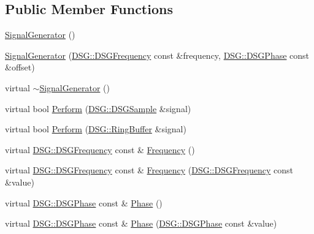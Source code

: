 \subsection*{Public Member Functions}
\begin{DoxyCompactItemize}
\item 
\hyperlink{class_d_s_g_1_1_signal_generator_a13ebda67fcdc880ef41aff501cc23fc3}{Signal\+Generator} ()
\item 
\hyperlink{class_d_s_g_1_1_signal_generator_a4036fceff5c05a3711b8516d850c414c}{Signal\+Generator} (\hyperlink{namespace_d_s_g_a4315a061386fa1014fda09b15d3a6973}{D\+S\+G\+::\+D\+S\+G\+Frequency} const \&frequency, \hyperlink{namespace_d_s_g_a44431ce1eb0a7300efdd207bc879e52c}{D\+S\+G\+::\+D\+S\+G\+Phase} const \&offset)
\item 
virtual \hyperlink{class_d_s_g_1_1_signal_generator_a7b52d391974bc36a19fdcf617ad976cb}{$\sim$\+Signal\+Generator} ()
\item 
virtual bool \hyperlink{class_d_s_g_1_1_signal_generator_a46fe75a81a242e191c5049d33ddf4155}{Perform} (\hyperlink{namespace_d_s_g_ac39a94cd27ebcd9c1e7502d0c624894a}{D\+S\+G\+::\+D\+S\+G\+Sample} \&signal)
\item 
virtual bool \hyperlink{class_d_s_g_1_1_signal_generator_ab050f80e84e6c8b3e354b56930d6a02b}{Perform} (\hyperlink{class_d_s_g_1_1_ring_buffer}{D\+S\+G\+::\+Ring\+Buffer} \&signal)
\item 
virtual \hyperlink{namespace_d_s_g_a4315a061386fa1014fda09b15d3a6973}{D\+S\+G\+::\+D\+S\+G\+Frequency} const \& \hyperlink{class_d_s_g_1_1_signal_generator_a4e6b3c43e76e53f8cd337ad699c464cb}{Frequency} ()
\item 
virtual \hyperlink{namespace_d_s_g_a4315a061386fa1014fda09b15d3a6973}{D\+S\+G\+::\+D\+S\+G\+Frequency} const \& \hyperlink{class_d_s_g_1_1_signal_generator_a30a79888f209d692df3d38f53fc58dfe}{Frequency} (\hyperlink{namespace_d_s_g_a4315a061386fa1014fda09b15d3a6973}{D\+S\+G\+::\+D\+S\+G\+Frequency} const \&value)
\item 
virtual \hyperlink{namespace_d_s_g_a44431ce1eb0a7300efdd207bc879e52c}{D\+S\+G\+::\+D\+S\+G\+Phase} const \& \hyperlink{class_d_s_g_1_1_signal_generator_a17cc4287b2838c6b6194fd43d02e7c00}{Phase} ()
\item 
virtual \hyperlink{namespace_d_s_g_a44431ce1eb0a7300efdd207bc879e52c}{D\+S\+G\+::\+D\+S\+G\+Phase} const \& \hyperlink{class_d_s_g_1_1_signal_generator_a315a3d3fca83eab7030af77dba63a564}{Phase} (\hyperlink{namespace_d_s_g_a44431ce1eb0a7300efdd207bc879e52c}{D\+S\+G\+::\+D\+S\+G\+Phase} const \&value)
\end{DoxyCompactItemize}

